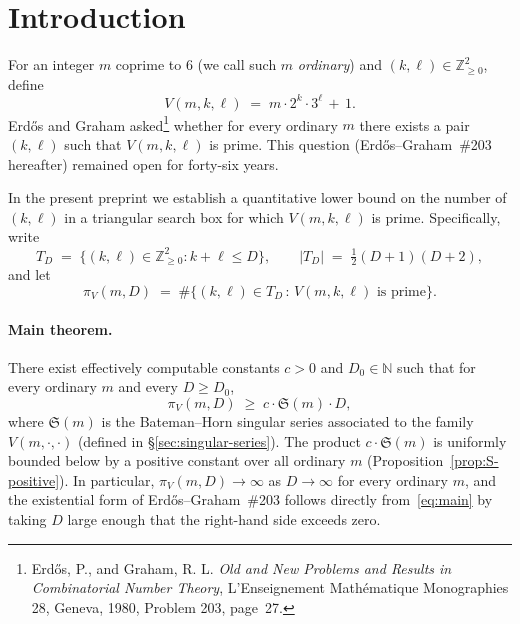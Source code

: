%

\section{Introduction}\label{sec:intro}

For an integer $m$ coprime to $6$ (we call such $m$ \emph{ordinary})
and $(k, \ell) \in \mathbb{Z}_{\geq 0}^{2}$, define
\begin{equation}\label{eq:V-defn}
  V(m, k, \ell) \;=\; m \cdot 2^{k} \cdot 3^{\ell} \,+\, 1.
\end{equation}
Erd\H{o}s and Graham asked\footnote{Erd\H{o}s, P., and Graham, R. L.
\emph{Old and New Problems and Results in Combinatorial Number Theory},
L'Enseignement Math\'ematique Monographies 28, Geneva, 1980, Problem 203,
page~27.} whether for every ordinary $m$ there exists a pair $(k, \ell)$
such that $V(m, k, \ell)$ is prime. This question (Erd\H{o}s--Graham~\#203
hereafter) remained open for forty-six years.

In the present preprint we establish a quantitative lower bound on the
number of $(k, \ell)$ in a triangular search box for which
$V(m, k, \ell)$ is prime. Specifically, write
\begin{equation}\label{eq:T-box}
  T_{D} \;=\; \{ (k, \ell) \in \mathbb{Z}_{\geq 0}^{2} : k + \ell \leq D \},
  \qquad |T_{D}| \;=\; \tfrac{1}{2}(D+1)(D+2),
\end{equation}
and let
\begin{equation}\label{eq:pi-V}
  \pi_{V}(m, D) \;=\; \# \bigl\{ (k, \ell) \in T_{D} \,:\, V(m, k, \ell)
  \text{ is prime} \bigr\}.
\end{equation}

\paragraph{Main theorem.}
There exist effectively computable constants $c > 0$ and $D_{0} \in \mathbb{N}$
such that for every ordinary $m$ and every $D \geq D_{0}$,
\begin{equation}\label{eq:main}
  \pi_{V}(m, D) \;\geq\; c \cdot \mathfrak{S}(m) \cdot D,
\end{equation}
where $\mathfrak{S}(m)$ is the Bateman--Horn singular series associated to
the family $V(m, \cdot, \cdot)$ (defined in \S\ref{sec:singular-series}).
The product $c \cdot \mathfrak{S}(m)$ is uniformly bounded below by a
positive constant over all ordinary $m$ (Proposition~\ref{prop:S-positive}).
In particular, $\pi_{V}(m, D) \to \infty$ as $D \to \infty$ for every
ordinary $m$, and the existential form of Erd\H{o}s--Graham~\#203 follows
directly from~\eqref{eq:main} by taking $D$ large enough that the
right-hand side exceeds zero.

